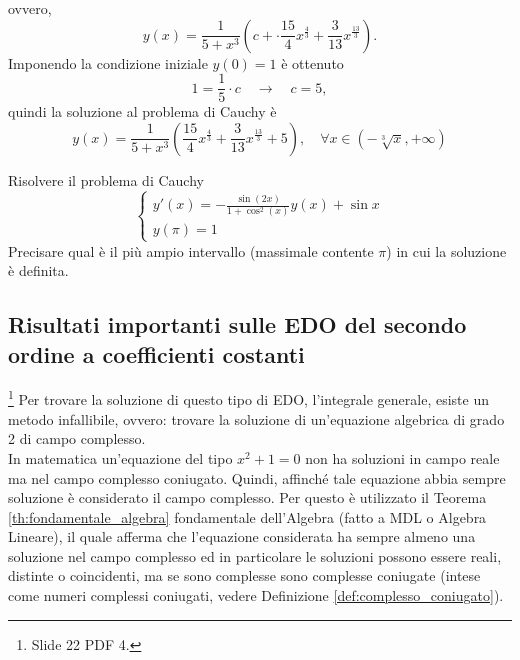 \begin{example}
    
    \noindent ovvero,
    \begin{equation*}
        y(x)= \frac{1}{5+x^3}\left(c+\cdot\frac{15}{4}x^{\frac{4}{3}} + \frac{3}{13}x^{\frac{13}{3}}\right).
    \end{equation*}
    Imponendo la condizione iniziale $y(0) = 1$ è ottenuto
    \begin{equation*}
        1=\frac{1}{5}\cdot c \quad\rightarrow\quad c=5,
    \end{equation*}
    quindi la soluzione al problema di Cauchy è
    \begin{equation*}
        y(x) = \frac{1}{5+x^3} \left(\frac{15}{4}x^{\frac{4}{3}} + \frac{3}{13}x^{\frac{13}{3}}+5\right),\quad \forall x\in(-\sqrt[3]{x}, +\infty)
    \end{equation*}
\end{example}

\begin{exercise}
    Risolvere il problema di Cauchy
    \begin{equation*}
        \begin{cases}
            y'(x) = -\frac{\sin(2x)}{1+\cos^2(x)}y(x) + \sin x\\
            y(\pi)= 1
        \end{cases}
    \end{equation*}
    Precisare qual è il più ampio intervallo (massimale contente $\pi$) in cui la soluzione è definita.
\end{exercise}

\subsection{Risultati importanti sulle EDO del secondo ordine a coefficienti costanti}\footnote{Slide 22 PDF 4.} 
Per trovare la soluzione di questo tipo di EDO, l'integrale generale, esiste un metodo infallibile, ovvero: trovare la soluzione di un'equazione algebrica di grado 2 di campo complesso.\\
In matematica un'equazione del tipo $x^2+1=0$ non ha soluzioni in campo reale ma nel campo complesso coniugato. Quindi, affinché tale equazione abbia sempre soluzione è considerato il campo complesso. Per questo è utilizzato il Teorema \ref{th:fondamentale_algebra} fondamentale dell'Algebra (fatto a MDL o Algebra Lineare), il quale afferma che l'equazione considerata ha sempre almeno una soluzione nel campo complesso ed in particolare le soluzioni possono essere reali, distinte o coincidenti, ma se sono complesse sono complesse coniugate (intese come numeri complessi coniugati, vedere Definizione \ref{def:complesso_coniugato}).

